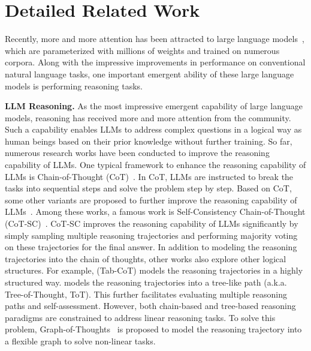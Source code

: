 \documentclass{article} %
\theoremstyle{plain}
\begin{document}
\clearpage
\appendix
\section{Detailed Related Work}
\label{appendix:detailed_related_work}
Recently, more and more attention has been attracted to large language models~\citep{gpt-4,qwen2.5}, which are parameterized with millions of weights and trained on numerous corpora. Along with the impressive improvements in performance on conventional natural language tasks, one important emergent ability of these large language models is performing reasoning tasks.

\textbf{LLM Reasoning.} As the most impressive emergent capability of large language models, reasoning has received more and more attention from the community. Such a capability enables LLMs to address complex questions in a logical way as human beings based on their prior knowledge without further training. So far, numerous research works have been conducted to improve the reasoning capability of LLMs. One typical framework to enhance the reasoning capability of LLMs is Chain-of-Thought (CoT)~\citep{cot}. In CoT, LLMs are instructed to break the tasks into sequential steps and solve the problem step by step. Based on CoT, some other variants are proposed to further improve the reasoning capability of LLMs~\citep{zelikman2022star, cot_sc, shum2023automatic}. Among these works, a famous work is Self-Consistency Chain-of-Thought (CoT-SC)~\citep{cot_sc}. CoT-SC improves the reasoning capability of LLMs significantly by simply sampling multiple reasoning trajectories and performing majority voting on these trajectories for the final answer. In addition to modeling the reasoning trajectories into the chain of thoughts, other works also explore other logical structures. For example, \cite{tab_cot} (Tab-CoT) models the reasoning trajectories in a highly structured way. \cite{tot} models the reasoning trajectories into a tree-like path (a.k.a. Tree-of-Thought, ToT). This further facilitates evaluating multiple reasoning paths and self-assessment. However, both chain-based and tree-based reasoning paradigms are constrained to address linear reasoning tasks. To solve this problem, Graph-of-Thoughts~\citep{graph_cot} is proposed to model the reasoning trajectory into a flexible graph to solve non-linear tasks.
\end{document}
